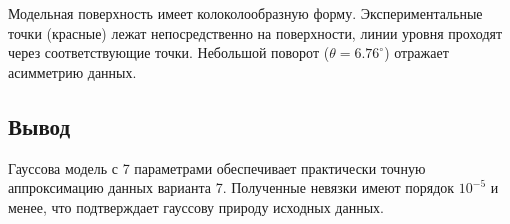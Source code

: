 Модельная поверхность имеет колоколообразную форму. Экспериментальные точки (красные) лежат непосредственно на поверхности, линии уровня проходят через соответствующие точки. Небольшой поворот ($\theta = 6.76^\circ$) отражает асимметрию данных.

\subsection{Вывод}

Гауссова модель с 7 параметрами обеспечивает практически точную аппроксимацию данных варианта 7. Полученные невязки имеют порядок $10^{-5}$ и менее, что подтверждает гауссову природу исходных данных.
